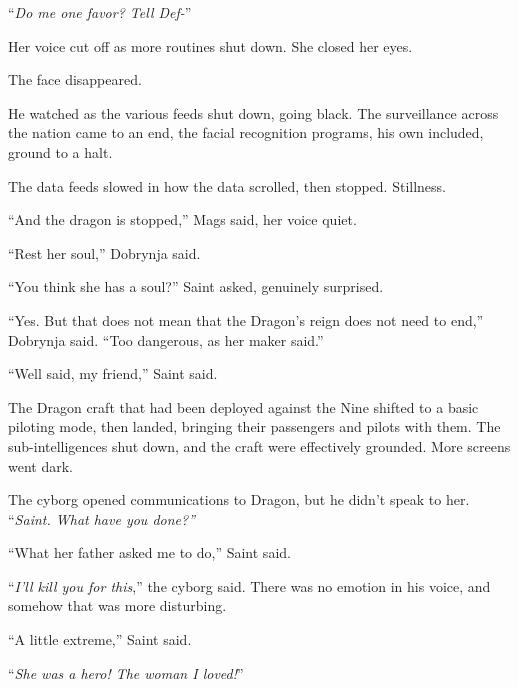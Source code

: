 ``\emph{Do me one favor?  Tell Def-}''



Her voice cut off as more routines shut down.  She closed her eyes.



The face disappeared.



He watched as the various feeds shut down, going black.  The surveillance across the nation came to an end, the facial recognition programs, his own included, ground to a halt.



The data feeds slowed in how the data scrolled, then stopped.  Stillness.



``And the dragon is stopped,'' Mags said, her voice quiet.



``Rest her soul,'' Dobrynja said.



``You think she has a soul?'' Saint asked, genuinely surprised.



``Yes.  But that does not mean that the Dragon's reign does not need to end,'' Dobrynja said.  ``Too dangerous, as her maker said.''



``Well said, my friend,'' Saint said.



The Dragon craft that had been deployed against the Nine shifted to a basic piloting mode, then landed, bringing their passengers and pilots with them.  The sub-intelligences shut down, and the craft were effectively grounded.  More screens went dark.



The cyborg opened communications to Dragon, but he didn't speak to her.  ``\emph{Saint.  What have you done?''}



``What her father asked me to do,'' Saint said.



``\emph{I'll kill you for this},'' the cyborg said.  There was no emotion in his voice, and somehow that was more disturbing.



``A little extreme,'' Saint said.



``\emph{She was a hero!  The woman I loved!}''



